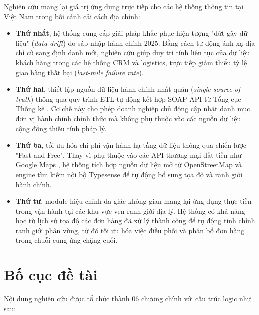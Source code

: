 Nghiên cứu mang lại giá trị ứng dụng trực tiếp cho các hệ thống thông tin tại Việt Nam trong bối cảnh cải cách địa chính:

\begin{itemize}
\item \textbf{Thứ nhất}, hệ thống cung cấp giải pháp khắc phục hiện tượng "đứt gãy dữ liệu" (\textit{data drift}) do sáp nhập hành chính 2025. Bằng cách tự động ánh xạ địa chỉ cũ sang định danh mới, nghiên cứu giúp duy trì tính liên tục của dữ liệu khách hàng trong các hệ thống CRM và logistics, trực tiếp giảm thiểu tỷ lệ giao hàng thất bại (\textit{last-mile failure rate}).

\item \textbf{Thứ hai}, thiết lập nguồn dữ liệu hành chính nhất quán (\textit{single source of truth}) thông qua quy trình ETL tự động kết hợp SOAP API từ Tổng cục Thống kê \cite{gso2025}. Cơ chế này cho phép doanh nghiệp chủ động cập nhật danh mục đơn vị hành chính chính thức mà không phụ thuộc vào các nguồn dữ liệu cộng đồng thiếu tính pháp lý.

\item \textbf{Thứ ba}, tối ưu hóa chi phí vận hành hạ tầng dữ liệu thông qua chiến lược "Fast and Free". Thay vì phụ thuộc vào các API thương mại đắt tiền như Google Maps \cite{google_maps_api}, hệ thống tích hợp nguồn dữ liệu mở từ OpenStreetMap và engine tìm kiếm nội bộ Typesense \cite{typesense} để tự động bổ sung tọa độ và ranh giới hành chính.

\item \textbf{Thứ tư}, module hiệu chỉnh đa giác không gian mang lại ứng dụng thực tiễn trong vận hành tại các khu vực ven ranh giới địa lý. Hệ thống có khả năng học từ lịch sử tọa độ các đơn hàng đã xử lý thành công để tự động tinh chỉnh ranh giới phân vùng, từ đó tối ưu hóa việc điều phối và phân bổ đơn hàng trong chuỗi cung ứng chặng cuối.

\end{itemize}


\section{Bố cục đề tài}
\label{sec:structure}

Nội dung nghiên cứu được tổ chức thành 06 chương chính với cấu trúc logic như sau:

